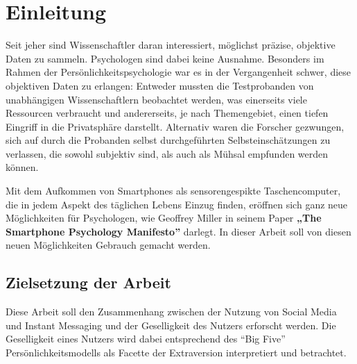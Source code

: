 
\chapter{Einleitung}
\label{ch:Einleitung}

Seit jeher sind Wissenschaftler daran interessiert, möglichst präzise, objektive Daten zu sammeln.
Psychologen sind dabei keine Ausnahme.
Besonders im Rahmen der Persönlichkeitspsychologie war es in der Vergangenheit schwer, diese objektiven Daten zu erlangen:
Entweder mussten die Testprobanden von unabhängigen Wissenschaftlern beobachtet werden,
was einerseits viele Ressourcen verbraucht und andererseits, je nach Themengebiet,
einen tiefen Eingriff in die Privatsphäre darstellt. Alternativ waren die Forscher gezwungen,
sich auf durch die Probanden selbst durchgeführten Selbsteinschätzungen zu verlassen,
die sowohl subjektiv sind, als auch als Mühsal empfunden werden können.\par

Mit dem Aufkommen von Smartphones als sensorengespikte Taschencomputer, die in jedem Aspekt des täglichen Lebens Einzug finden,
eröffnen sich ganz neue Möglichkeiten für Psychologen, wie Geoffrey Miller in seinem Paper \textbf{„The Smartphone Psychology Manifesto”} \cite{miller2012smartphone}
darlegt. In dieser Arbeit soll von diesen neuen Möglichkeiten Gebrauch gemacht werden.\par




\section{Zielsetzung der Arbeit}
\label{ch:Einleitung:sec:Zielsetzung}

Diese Arbeit soll den Zusammenhang zwischen der Nutzung von Social Media und Instant Messaging und der Geselligkeit des Nutzers erforscht werden.
Die Geselligkeit eines Nutzers wird dabei entsprechend des "`Big Five"' Persönlichkeitsmodells als Facette der Extraversion interpretiert und betrachtet.

